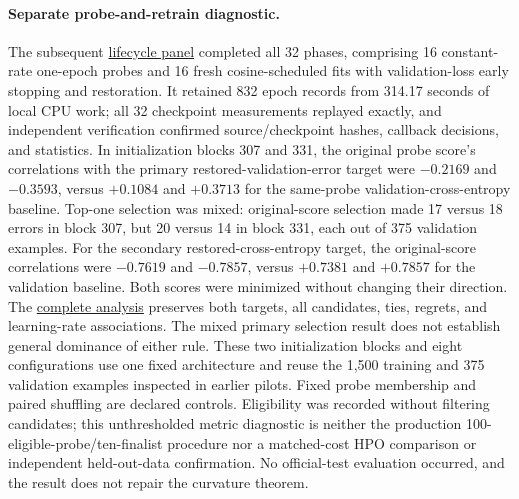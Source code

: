 \paragraph{Separate probe-and-retrain diagnostic.}
The subsequent \href{run:../sweep-results/research-audit-20261002/lifecycle-pilot/run-prepared-20261002-v1/interpretation.txt}{lifecycle panel} completed all 32 phases, comprising 16 constant-rate one-epoch probes and 16 fresh cosine-scheduled fits with validation-loss early stopping and restoration. It retained 832 epoch records from 314.17 seconds of local CPU work; all 32 checkpoint measurements replayed exactly, and independent verification confirmed source/checkpoint hashes, callback decisions, and statistics. In initialization blocks 307 and 331, the original probe score's correlations with the primary restored-validation-error target were $-0.2169$ and $-0.3593$, versus $+0.1084$ and $+0.3713$ for the same-probe validation-cross-entropy baseline. Top-one selection was mixed: original-score selection made 17 versus 18 errors in block 307, but 20 versus 14 in block 331, each out of 375 validation examples. For the secondary restored-cross-entropy target, the original-score correlations were $-0.7619$ and $-0.7857$, versus $+0.7381$ and $+0.7857$ for the validation baseline. Both scores were minimized without changing their direction. The \href{run:../sweep-results/research-audit-20261002/lifecycle-pilot/run-prepared-20261002-v1/analysis.json}{complete analysis} preserves both targets, all candidates, ties, regrets, and learning-rate associations. The mixed primary selection result does not establish general dominance of either rule. These two initialization blocks and eight configurations use one fixed architecture and reuse the 1,500 training and 375 validation examples inspected in earlier pilots. Fixed probe membership and paired shuffling are declared controls. Eligibility was recorded without filtering candidates; this unthresholded metric diagnostic is neither the production 100-eligible-probe/ten-finalist procedure nor a matched-cost HPO comparison or independent held-out-data confirmation. No official-test evaluation occurred, and the result does not repair the curvature theorem.

